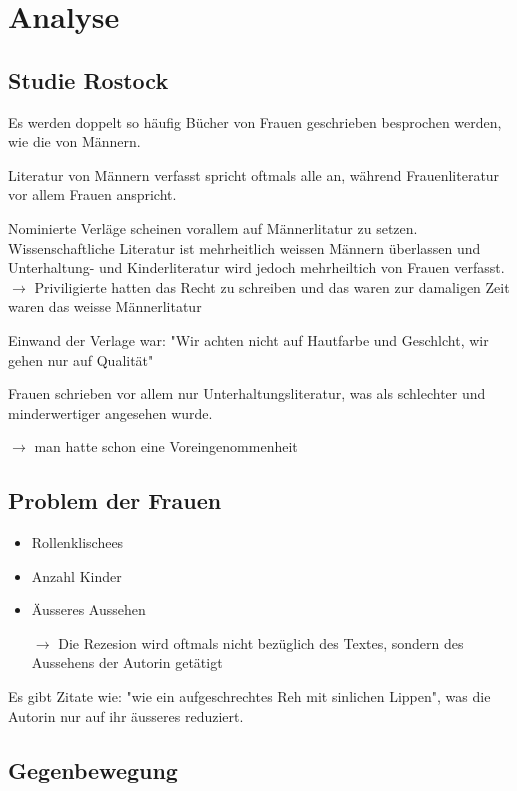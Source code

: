 \documentclass{article}
\begin{document}


\section{Analyse}
\subsection{Studie Rostock}
Es werden doppelt so häufig Bücher von Frauen geschrieben besprochen werden, wie die von Männern.

Literatur von Männern verfasst spricht oftmals alle an, während Frauenliteratur vor allem Frauen anspricht.

Nominierte Verläge scheinen vorallem auf Männerlitatur zu setzen. Wissenschaftliche Literatur ist mehrheitlich weissen Männern überlassen und Unterhaltung- und Kinderliteratur wird jedoch mehrheiltich von Frauen verfasst. \\

$\rightarrow$ Priviligierte hatten das Recht zu schreiben und das waren zur damaligen Zeit waren das weisse Männerlitatur

Einwand der Verlage war: "Wir achten nicht auf Hautfarbe und Geschlcht, wir gehen nur auf Qualität"

Frauen schrieben vor allem nur Unterhaltungsliteratur, was als schlechter und minderwertiger angesehen wurde.

$\rightarrow$ man hatte schon eine Voreingenommenheit

\subsection{Problem der Frauen}
\begin{itemize}
    \item Rollenklischees
    \item Anzahl Kinder
    \item Äusseres Aussehen

    $\rightarrow$ Die Rezesion wird oftmals nicht bezüglich des Textes, sondern des Aussehens der Autorin getätigt
\end{itemize}

Es gibt Zitate wie: "wie ein aufgeschrechtes Reh mit sinlichen Lippen", was die Autorin nur auf ihr äusseres reduziert.

\subsection{Gegenbewegung}
\end{document}
